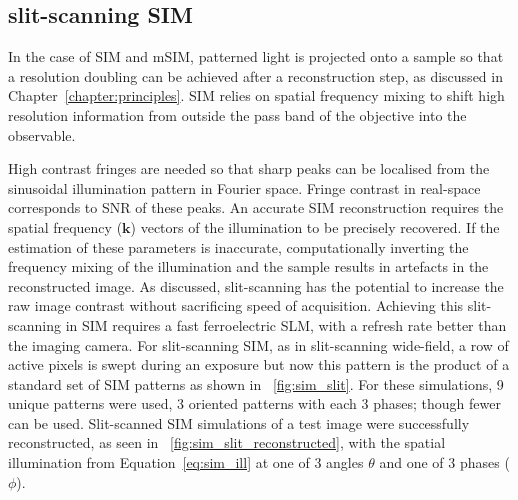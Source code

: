 \subsection{\Gls{slit-scanning} \gls{SIM}}

In the case of \gls{SIM} and \gls{mSIM}, patterned light is projected onto a sample so that a resolution doubling can be achieved after a reconstruction step, as discussed in Chapter~\ref{chapter:principles}.
\gls{SIM} relies on spatial frequency mixing to shift high resolution information from outside the pass band of the objective into the observable.

High contrast fringes are needed so that sharp peaks can be localised from the sinusoidal illumination pattern in Fourier space.
Fringe contrast in real-space corresponds to \gls{SNR} of these peaks.
An accurate \gls{SIM} reconstruction requires the spatial frequency (\(\mathbf{k}\)) vectors of the illumination to be precisely recovered.
If the estimation of these parameters is inaccurate, computationally inverting the frequency mixing of the illumination and the sample results in artefacts in the reconstructed image.
As discussed, \gls{slit-scanning} has the potential to increase the raw image contrast without sacrificing speed of acquisition.
Achieving this slit-scanning in \gls{SIM} requires a fast ferroelectric \gls{SLM}, with a refresh rate better than the imaging camera.
For slit-scanning \gls{SIM}, as in slit-scanning \gls{wide-field}, a row of active pixels is swept during an exposure but now this pattern is the product of a standard set of \gls{SIM} patterns as shown in \figurename~\ref{fig:sim_slit}.
For these simulations, 9 unique patterns were used, 3 oriented patterns with each 3 phases; though fewer can be used\cite{strohlSpeedLimitsStructured2017}.
Slit-scanned \gls{SIM} simulations of a test image were successfully reconstructed, as seen in \figurename~\ref{fig:sim_slit_reconstructed}, with the spatial illumination from Equation~\eqref{eq:sim_ill} at one of 3 angles \(\theta \) and one of 3 phases (\(\phi \)).

